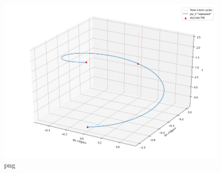 \begin{figure}
\centering
\includegraphics[width=\textwidth]{img/psi_V.png}
\caption{png}
\end{figure}
